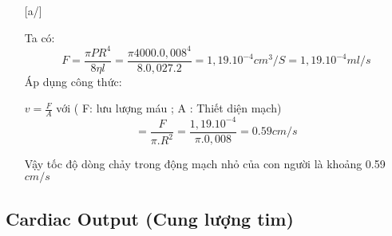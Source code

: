 \documentclass[12pt,a4paper]{article}
\begin{document}
\begin{enumerate} [a/]
\begin{flushleft}
		      Ta có:
		      $$F=\frac{\pi PR^4}{8\eta l}=\frac{\pi 4000.0,008^4}{8.0,027.2}=1,19.10^{-4} cm^3/S=1,19.10^{-4} ml/s$$
		      Áp dụng công thức:
	      \end{flushleft}
	      \begin{center}
		      $v=\frac{F}{A}$ với ( F: lưu lượng máu ; A : Thiết diện mạch)
		      $$=\frac{F}{\pi.R^2}=\frac{1,19.10^{-4}}{\pi . 0,008}=0.59 cm/s$$
	      \end{center}
	      \begin{flushleft}
		      Vậy tốc độ dòng chảy trong động mạch nhỏ của con người là khoảng 0.59 $cm/s$
	      \end{flushleft}
\end{enumerate}

\newpage
\subsection{Cardiac Output (Cung lượng tim)}
\end{document}
